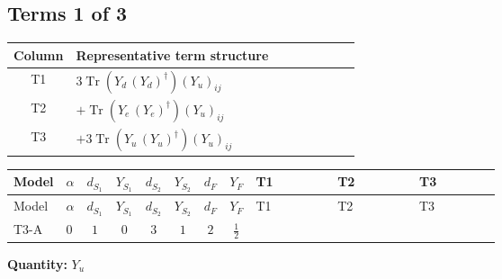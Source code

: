 \documentclass[8pt]{article}
\begin{document}
\begin{landscape}
\subsection*{Terms 1 of 3}
\begin{center}
\begin{tabular}{@{}c >{\raggedright\arraybackslash}p{0.82\linewidth}@{}}
\toprule
Column & Representative term structure \\
\midrule
T1 & \(\displaystyle 3 \operatorname{Tr}\!\left({Y_d}\,\left({Y_d}\right)^{\dagger}\right) \left({Y_u}\right)_{ij}\) \\
\midrule
T2 & \(\displaystyle +\operatorname{Tr}\!\left({Y_e}\,\left({Y_e}\right)^{\dagger}\right) \left({Y_u}\right)_{ij}\) \\
\midrule
T3 & \(\displaystyle +3 \operatorname{Tr}\!\left({Y_u}\,\left({Y_u}\right)^{\dagger}\right) \left({Y_u}\right)_{ij}\) \\
\midrule
\bottomrule
\end{tabular}
\end{center}
\smallskip
\tiny
\begin{longtable}{@{}llcccccc >{\raggedright\arraybackslash}p{0.21\linewidth} >{\raggedright\arraybackslash}p{0.21\linewidth} >{\raggedright\arraybackslash}p{0.21\linewidth}@{}}
\toprule
Model & $\alpha$ & $d_{S_1}$ & $Y_{S_1}$ & $d_{S_2}$ & $Y_{S_2}$ & $d_F$ & $Y_F$ & T1 & T2 & T3 \\
\midrule
\endfirsthead
\toprule
Model & $\alpha$ & $d_{S_1}$ & $Y_{S_1}$ & $d_{S_2}$ & $Y_{S_2}$ & $d_F$ & $Y_F$ & T1 & T2 & T3 \\
\midrule
\endhead
T3-A & $0$ & $1$ & $0$ & $3$ & $1$ & $2$ & $\frac{1}{2}$ & \scriptsize\adjustbox{max width=\linewidth}{$\begin{gathered} 3 \operatorname{Tr}\!\left({Y_d}\,\left({Y_d}\right)^{\dagger}\right) \left({Y_u}\right)_{ij}\end{gathered}$} & \scriptsize\adjustbox{max width=\linewidth}{$\begin{gathered} +\operatorname{Tr}\!\left({Y_e}\,\left({Y_e}\right)^{\dagger}\right) \left({Y_u}\right)_{ij}\end{gathered}$} & \scriptsize\adjustbox{max width=\linewidth}{$\begin{gathered} +3 \operatorname{Tr}\!\left({Y_u}\,\left({Y_u}\right)^{\dagger}\right) \left({Y_u}\right)_{ij}\end{gathered}$} \\
\midrule
\bottomrule
\end{longtable}
\clearpage
\noindent\textbf{Quantity: }$Y_u$\par\smallskip

\end{landscape}
\end{document}
